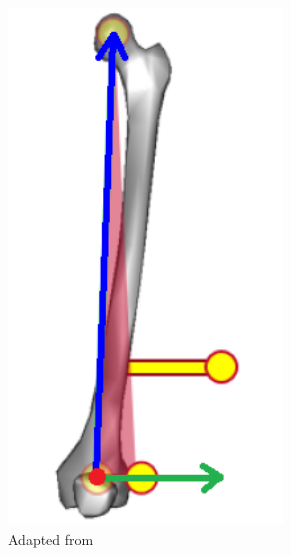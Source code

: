 \documentclass[../main.tex]{subfiles}
\begin{document}
\begin{figure}[!htb]
    \centering
    \begin{subfigure}[t]{0.3\textwidth}
        \centering
        \includegraphics[width=0.8\textwidth]{img/LeftFootFemur_PiG_wCoord.png}
        \caption{Adapted from \cite{Baker2017}}
        \label{fig:cgm23-femur-jc}
    \end{subfigure}
     ~
    \begin{subfigure}[t]{0.3\textwidth}
        \centering

\end{subfigure}
\end{figure}
\end{document}
